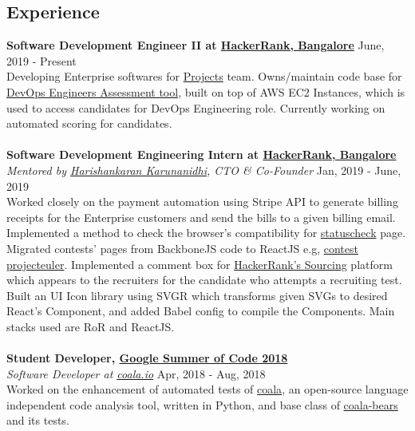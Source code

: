 \documentclass[margin, centered]{res}
\begin{document}
\begin{resume}
    \section{Experience}
    \textbf{Software Development Engineer II at \href{https://www.hackerrank.com}{HackerRank, Bangalore}} \hfill June, 2019 - Present \\
    Developing Enterprise softwares for \href{https://www.hackerrank.com/products/projects}{Projects} team. Owns/maintain code base for \href{https://www.hackerrank.com/products/projects#role5}{DevOps Engineers Assessment tool},
    built on top of AWS EC2 Instances, which is used to access candidates for DevOps Engineering role. Currently working on automated scoring for candidates.\\
    \\
    \textbf{Software Development Engineering Intern at \href{https://www.hackerrank.com}{HackerRank, Bangalore}} \\
    \emph{Mentored by \href{https://www.hackerrank.com/about-us/our-team/}{Harishankaran Karunanidhi}\footnotesize{, CTO \& Co-Founder}} \hfill Jan, 2019 - June, 2019 \\
    Worked closely on the payment automation using Stripe API to generate billing receipts for
    the Enterprise customers and send the bills to a given billing email. Implemented a method to check the browser's compatibility
    for \href{https://www.hackerrank.com/statuscheck}{statuscheck} page. Migrated contests' pages from
    BackboneJS code to ReactJS e.g, \href{https://www.hackerrank.com/projecteuler/}{contest projecteuler}.
    Implemented a comment box for \href{https://www.hackerrank.com/work}{HackerRank's Sourcing} platform
    which appears to the recruiters for the candidate who attempts a recruiting test. Built an UI Icon library
    using SVGR which transforms given SVGs to desired React's Component, and added Babel config to compile
    the Components. Main stacks used are RoR and ReactJS. \\
    \\
    \textbf{Student Developer, \href{https://summerofcode.withgoogle.com/}{Google Summer of Code 2018}} \\
    \emph{Software Developer at \href{https://coala.io/}{coala.io}} \hfill Apr, 2018 - Aug, 2018 \\
    Worked on the enhancement of automated tests of \href{https://github.com/coala/coala}{coala},
    an open-source language independent code analysis tool, written in Python, and base
    class of \href{https://github.com/coala/coala-bears}{coala-bears} and its tests.

\end{resume}
\end{document}
